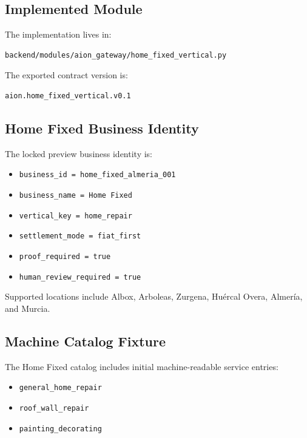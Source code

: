 \subsection{Implemented Module}

The implementation lives in:

\begin{verbatim}
backend/modules/aion_gateway/home_fixed_vertical.py
\end{verbatim}

The exported contract version is:

\begin{verbatim}
aion.home_fixed_vertical.v0.1
\end{verbatim}

\subsection{Home Fixed Business Identity}

The locked preview business identity is:

\begin{itemize}
  \item \texttt{business\_id = home\_fixed\_almeria\_001}
  \item \texttt{business\_name = Home Fixed}
  \item \texttt{vertical\_key = home\_repair}
  \item \texttt{settlement\_mode = fiat\_first}
  \item \texttt{proof\_required = true}
  \item \texttt{human\_review\_required = true}
\end{itemize}

Supported locations include Albox, Arboleas, Zurgena, Huércal Overa, Almería, and Murcia.

\subsection{Machine Catalog Fixture}

The Home Fixed catalog includes initial machine-readable service entries:

\begin{itemize}
  \item \texttt{general\_home\_repair}
  \item \texttt{roof\_wall\_repair}
  \item \texttt{painting\_decorating}
\end{itemize}

